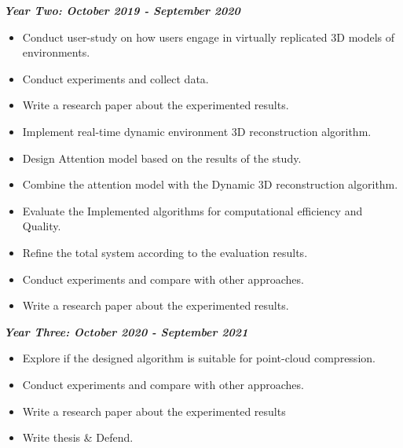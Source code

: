 \textbf{\textit{Year Two: October 2019 - September 2020}}
\begin{itemize}
    \item Conduct user-study on how users engage in virtually replicated 3D models of environments.
    \item Conduct experiments and collect data.
    \item Write a research paper about the experimented results.
    \item Implement real-time dynamic environment 3D reconstruction algorithm.
    \item Design Attention model based on the results of the study.
    \item Combine the attention model with the Dynamic 3D reconstruction algorithm.
    \item Evaluate the Implemented algorithms for computational efficiency and Quality. 
    \item Refine the total system according to the evaluation results.
    \item Conduct experiments and compare with other approaches.
    \item Write a research paper about the experimented results.
\end{itemize}


\textbf{\textit{Year Three: October 2020 - September 2021}}
\begin{itemize}
    \item Explore if the designed algorithm is suitable for point-cloud compression.
    \item Conduct experiments and compare with other approaches.
    \item Write a research paper about the experimented results
    \item Write thesis & Defend.
\end{itemize}